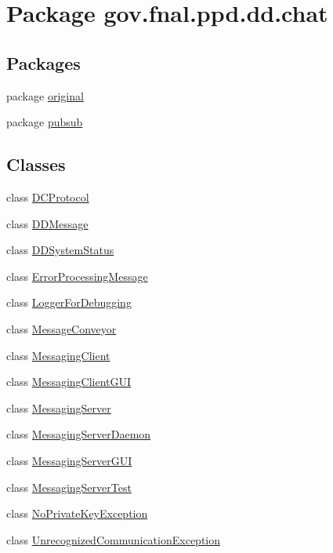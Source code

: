 \hypertarget{namespacegov_1_1fnal_1_1ppd_1_1dd_1_1chat}{\section{Package gov.\-fnal.\-ppd.\-dd.\-chat}
\label{namespacegov_1_1fnal_1_1ppd_1_1dd_1_1chat}
}
\subsection*{Packages}
\begin{DoxyCompactItemize}
\item 
package \hyperlink{namespacegov_1_1fnal_1_1ppd_1_1dd_1_1chat_1_1original}{original}
\item 
package \hyperlink{namespacegov_1_1fnal_1_1ppd_1_1dd_1_1chat_1_1pubsub}{pubsub}
\end{DoxyCompactItemize}
\subsection*{Classes}
\begin{DoxyCompactItemize}
\item 
class \hyperlink{classgov_1_1fnal_1_1ppd_1_1dd_1_1chat_1_1DCProtocol}{D\-C\-Protocol}
\item 
class \hyperlink{classgov_1_1fnal_1_1ppd_1_1dd_1_1chat_1_1DDMessage}{D\-D\-Message}
\item 
class \hyperlink{classgov_1_1fnal_1_1ppd_1_1dd_1_1chat_1_1DDSystemStatus}{D\-D\-System\-Status}
\item 
class \hyperlink{classgov_1_1fnal_1_1ppd_1_1dd_1_1chat_1_1ErrorProcessingMessage}{Error\-Processing\-Message}
\item 
class \hyperlink{classgov_1_1fnal_1_1ppd_1_1dd_1_1chat_1_1LoggerForDebugging}{Logger\-For\-Debugging}
\item 
class \hyperlink{classgov_1_1fnal_1_1ppd_1_1dd_1_1chat_1_1MessageConveyor}{Message\-Conveyor}
\item 
class \hyperlink{classgov_1_1fnal_1_1ppd_1_1dd_1_1chat_1_1MessagingClient}{Messaging\-Client}
\item 
class \hyperlink{classgov_1_1fnal_1_1ppd_1_1dd_1_1chat_1_1MessagingClientGUI}{Messaging\-Client\-G\-U\-I}
\item 
class \hyperlink{classgov_1_1fnal_1_1ppd_1_1dd_1_1chat_1_1MessagingServer}{Messaging\-Server}
\item 
class \hyperlink{classgov_1_1fnal_1_1ppd_1_1dd_1_1chat_1_1MessagingServerDaemon}{Messaging\-Server\-Daemon}
\item 
class \hyperlink{classgov_1_1fnal_1_1ppd_1_1dd_1_1chat_1_1MessagingServerGUI}{Messaging\-Server\-G\-U\-I}
\item 
class \hyperlink{classgov_1_1fnal_1_1ppd_1_1dd_1_1chat_1_1MessagingServerTest}{Messaging\-Server\-Test}
\item 
class \hyperlink{classgov_1_1fnal_1_1ppd_1_1dd_1_1chat_1_1NoPrivateKeyException}{No\-Private\-Key\-Exception}
\item 
class \hyperlink{classgov_1_1fnal_1_1ppd_1_1dd_1_1chat_1_1UnrecognizedCommunicationException}{Unrecognized\-Communication\-Exception}
\end{DoxyCompactItemize}



